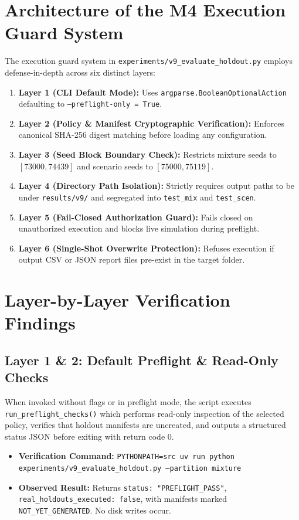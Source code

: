 \documentclass[10pt,a4paper]{article}
\begin{document}
\section{Architecture of the M4 Execution Guard System}
The execution guard system in \texttt{experiments/v9\_evaluate\_holdout.py} employs defense-in-depth across six distinct layers:
\begin{enumerate}
    \item \textbf{Layer 1 (CLI Default Mode):} Uses \texttt{argparse.BooleanOptionalAction} defaulting to \texttt{--preflight-only = True}.
    \item \textbf{Layer 2 (Policy \& Manifest Cryptographic Verification):} Enforces canonical SHA-256 digest matching before loading any configuration.
    \item \textbf{Layer 3 (Seed Block Boundary Check):} Restricts mixture seeds to $[73000, 74439]$ and scenario seeds to $[75000, 75119]$.
    \item \textbf{Layer 4 (Directory Path Isolation):} Strictly requires output paths to be under \texttt{results/v9/} and segregated into \texttt{test\_mix} and \texttt{test\_scen}.
    \item \textbf{Layer 5 (Fail-Closed Authorization Guard):} Fails closed on unauthorized execution and blocks live simulation during preflight.
    \item \textbf{Layer 6 (Single-Shot Overwrite Protection):} Refuses execution if output CSV or JSON report files pre-exist in the target folder.
\end{enumerate}

\section{Layer-by-Layer Verification Findings}

\subsection{Layer 1 \& 2: Default Preflight \& Read-Only Checks}
When invoked without flags or in preflight mode, the script executes \texttt{run\_preflight\_checks()} which performs read-only inspection of the selected policy, verifies that holdout manifests are uncreated, and outputs a structured status JSON before exiting with return code 0.
\begin{itemize}
    \item \textbf{Verification Command:} \texttt{PYTHONPATH=src uv run python experiments/v9\_evaluate\_holdout.py --partition mixture}
    \item \textbf{Observed Result:} Returns \texttt{status: "PREFLIGHT\_PASS"}, \texttt{real\_holdouts\_executed: false}, with manifests marked \texttt{NOT\_YET\_GENERATED}. No disk writes occur.
\end{itemize}
\end{document}
